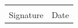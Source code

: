 \documentclass{tufte-book} %
\begin{document}
\vspace{0.5in}
\begin{tabular}{@{}p{3in}p{1in}@{}}
\hrulefill & \hrulefill \\
Signature & Date\\
\end{tabular}













\end{document}
